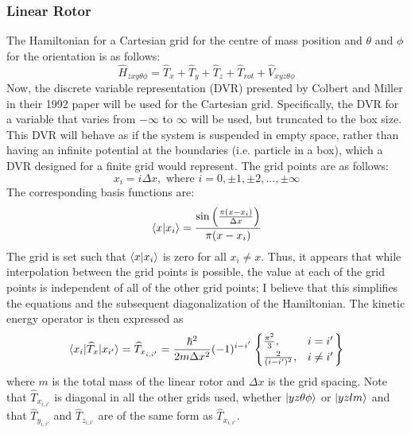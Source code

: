 \documentclass{revtex4-1}
\begin{document}
\subsubsection{Linear Rotor}\label{S:LinRotH}
The Hamiltonian for a Cartesian grid for the centre of mass position and $\theta$ and $\phi$ for the orientation is as follows:
\begin{equation}
\widehat{H}_{zxy\theta\phi} = \widehat{T}_{x} + \widehat{T}_{y} + \widehat{T}_{z} + \widehat{T}_{rot} + \widehat{V}_{xyz\theta\phi} 
\end{equation}
Now, the discrete variable representation (DVR) presented by Colbert and Miller in their 1992 paper will be used for the Cartesian grid. Specifically, the DVR for a variable that varies from $-\infty$ to $\infty$ will be used, but truncated to the box size. This DVR will behave as if the system is suspended in empty space, rather than having an infinite potential at the boundaries (i.e. particle in a box), which a DVR designed for a finite grid would represent.
The grid points are as follows:
\begin{equation}
x_{i} = i\Delta x, \text{ where } i = 0, \pm 1, \pm 2, ..., \pm \infty
\end{equation}
The corresponding basis functions are:
\begin{equation}
\braket{x|x_{i}} = \frac{\sin \left(\frac{\pi(x-x_{i})}{\Delta x}\right)}{\pi(x-x_{i})}
\end{equation}
The grid is set such that $\braket{x|x_{i}}$ is zero for all $x_{i}\neq x$. Thus, it appears that while interpolation between the grid points is possible, the value at each of the grid points is independent of all of the other grid points; I believe that this simplifies the equations and the subsequent diagonalization of the Hamiltonian. The kinetic energy operator is then expressed as 
\begin{equation}
\braket{x_{i}|\widehat{T}_{x}|x_{i'}}=\widehat{T}_{x_{i,i'}}=\frac{\hbar^{2}}{2m\Delta x^{2}} (-1)^{i-i'} \left.\begin{cases} \frac{\pi^{2}}{3}, & i=i'\\
																			    \frac{2}{(i-i')^{2}}, &i\neq i'
																			    \end{cases}\right\}
\end{equation}
where $m$ is the total mass of the linear rotor and $\Delta x$ is the grid spacing.
Note that $\widehat{T}_{x_{i,i'}}$ is diagonal in all the other grids used, whether $\ket{yz\theta\phi}$ or $\ket{yzlm}$ and that $\widehat{T}_{y_{i,i'}}$ and $\widehat{T}_{z_{i,i'}}$ are of the same form as $\widehat{T}_{x_{i,i'}}$.
\end{document}

